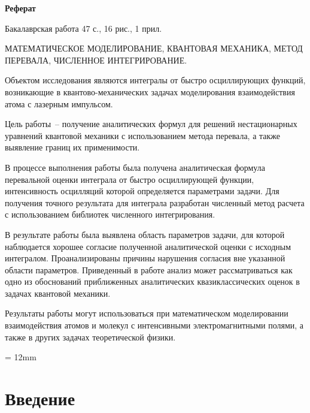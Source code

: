 \documentclass[14pt, a4paper]{article}
\numberwithin{figure}{section}
\numberwithin{equation}{section}
\begin{document}
\newpage%
\addtocounter{page}{1}
\begin{center}
{\normalsize \textbf{Реферат}}
\end{center}

\noindent Бакалаврская работа 47 с., 16 рис., 1 прил.

\vspace{0.5cm}

\noindent МАТЕМАТИЧЕСКОЕ МОДЕЛИРОВАНИЕ, КВАНТОВАЯ МЕХАНИКА, МЕТОД ПЕРЕВАЛА, ЧИСЛЕННОЕ ИНТЕГРИРОВАНИЕ.

\vspace{0.5cm}

Объектом исследования являются интегралы от быстро осциллирующих функций, возникающие в квантово-механических задачах моделирования взаимодействия атома с лазерным импульсом.

Цель работы~-- получение аналитических формул для решений нестационарных уравнений квантовой механики с использованием метода перевала, а также выявление границ их применимости.

В процессе выполнения работы была получена аналитическая формула перевальной оценки интеграла от быстро осциллирующей функции, интенсивность осцилляций которой определяется параметрами задачи. Для получения точного результата для интеграла разработан численный метод расчета с использованием библиотек численного интегрирования.

В результате работы была выявлена область параметров задачи, для которой наблюдается хорошее согласие полученной аналитической оценки с исходным интегралом. Проанализированы причины нарушения согласия вне указанной области параметров. Приведенный в работе анализ может рассматриваться как одно из обоснований приближенных аналитических квазиклассических оценок в задачах квантовой механики.

Результаты работы могут использоваться при математическом моделировании взаимодействия атомов и молекул с интенсивными электромагнитными полями, а также в других задачах теоретической физики.


{}
\parindent = 12mm



\tableofcontents

\newpage

\section*{\centering Введение}
\end{document}
